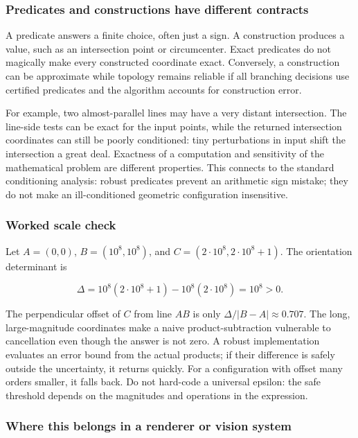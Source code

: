 \subsubsection{Predicates and constructions have different contracts}\label{predicates-and-constructions-have-different-contracts}

A predicate answers a finite choice, often just a sign. A construction produces a value, such as an intersection point or circumcenter. Exact predicates do not magically make every constructed coordinate exact. Conversely, a construction can be approximate while topology remains reliable if all branching decisions use certified predicates and the algorithm accounts for construction error.

For example, two almost-parallel lines may have a very distant intersection. The line-side tests can be exact for the input points, while the returned intersection coordinates can still be poorly conditioned: tiny perturbations in input shift the intersection a great deal. Exactness of a computation and sensitivity of the mathematical problem are different properties. This connects to the standard conditioning analysis: robust predicates prevent an arithmetic sign mistake; they do not make an ill-conditioned geometric configuration insensitive.

\subsubsection{Worked scale check}\label{worked-scale-check}

Let \(A=(0,0)\), \(B=(10^8,10^8)\), and \(C=(2\cdot10^8,2\cdot10^8+1)\). The orientation determinant is

\[
\Delta=10^8(2\cdot10^8+1)-10^8(2\cdot10^8)=10^8>0.
\]

The perpendicular offset of \(C\) from line \(AB\) is only \(\Delta/|B-A|\approx0.707\). The long, large-magnitude coordinates make a naive product-subtraction vulnerable to cancellation even though the answer is not zero. A robust implementation evaluates an error bound from the actual products; if their difference is safely outside the uncertainty, it returns quickly. For a configuration with offset many orders smaller, it falls back. Do not hard-code a universal epsilon: the safe threshold depends on the magnitudes and operations in the expression.

\subsubsection{Where this belongs in a renderer or vision system}\label{where-this-belongs-in-a-renderer-or-vision-system}

